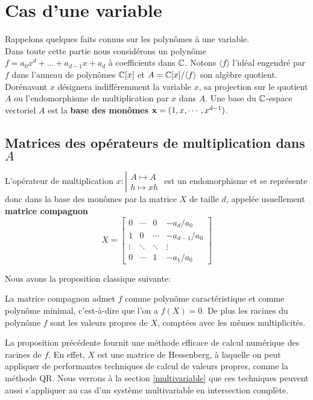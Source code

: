\documentclass{standalone}
\begin{document}
\section{Cas d'une variable}
\label{univariable}
Rappelons quelques faits connus sur les polynômes à une variable.\\
Dans toute cette partie nous considérons un polynôme $f = a_0x^d + \dots + a_{d-1}x + a_d$ à coefficients dans $\mathbb{C}$. Notons $\langle f \rangle$ l'idéal engendré par $f$ dans l'anneau de polynômes $\mathbb{C}[x]$ et $A = \mathbb{C}[x]/\langle f \rangle$  son algèbre quotient. Dorénavant $x$ désignera indifféremment la variable $x$, sa projection sur le quotient $A$ ou l'endomorphisme de multiplication par $x$ dans $A$. Une base du $\mathbb{C}$-espace vectoriel $A$ est la {\bf base des monômes} $\bold{x} = (1, x,\cdots, x^{d-1})$.

\subsection{Matrices des opérateurs de multiplication dans $A$}
L'opérateur de multiplication
$x : \left\vert
\begin{array}{c}
A \mapsto A \\
h \mapsto xh
\end{array}
\right.$
est un endomorphisme et se représente donc dans la base des monômes par la matrice $X$ de taille $d$, appelée usuellement {\bf matrice compagnon}
\begin{equation}
\label{compan}
X =
\begin{bmatrix}
	0 & \cdots & 0 & -a_d/a_0 \\
	1 & 0 & \cdots & -a_{d-1}/a_0 \\
	\vdots  & \ddots  & \ddots & \vdots  \\
	0 & \cdots & 1 & -a_1/a_0
\end{bmatrix}
\end{equation}

Nous avons la proposition classique suivante:
\begin{prop}
\label{compan2roots}
La matrice compagnon admet $f$ comme polynôme caractéristique et comme polynôme minimal, c'est-à-dire que l'on a $f(X) = 0$. De plus les racines du polynôme $f$ sont les valeurs propres de $X$, comptées avec les mêmes multiplicités.
\end{prop}

\begin{rem}
La proposition précédente fournit une méthode efficace de calcul numérique des racines de $f$. En effet, $X$ est une matrice de Hessenberg, à laquelle on peut appliquer de performantes techniques de calcul de valeurs propres, comme la méthode QR. Nous verrons à la section \ref{multivariable} que ces techniques peuvent aussi s'appliquer au cas d'un système multivariable en intersection complète.
\end{rem}
\end{document}
